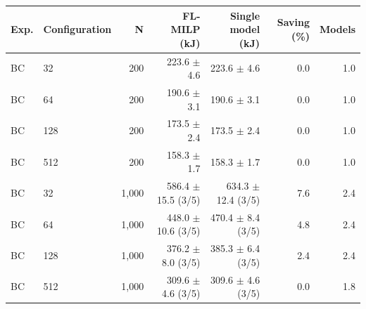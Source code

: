 \begin{tabular}{llrrrrr}
\toprule
Exp. & Configuration & N & FL-MILP (kJ) & Single model (kJ) & Saving (\%) & Models \\
\midrule
BC & 32 & 200 & 223.6 $\pm$ 4.6 & 223.6 $\pm$ 4.6 & 0.0 & 1.0 \\
BC & 64 & 200 & 190.6 $\pm$ 3.1 & 190.6 $\pm$ 3.1 & 0.0 & 1.0 \\
BC & 128 & 200 & 173.5 $\pm$ 2.4 & 173.5 $\pm$ 2.4 & 0.0 & 1.0 \\
BC & 512 & 200 & 158.3 $\pm$ 1.7 & 158.3 $\pm$ 1.7 & 0.0 & 1.0 \\
BC & 32 & 1,000 & 586.4 $\pm$ 15.5 (3/5) & 634.3 $\pm$ 12.4 (3/5) & 7.6 & 2.4 \\
BC & 64 & 1,000 & 448.0 $\pm$ 10.6 (3/5) & 470.4 $\pm$ 8.4 (3/5) & 4.8 & 2.4 \\
BC & 128 & 1,000 & 376.2 $\pm$ 8.0 (3/5) & 385.3 $\pm$ 6.4 (3/5) & 2.4 & 2.4 \\
BC & 512 & 1,000 & 309.6 $\pm$ 4.6 (3/5) & 309.6 $\pm$ 4.6 (3/5) & 0.0 & 1.8 \\
\bottomrule
\end{tabular}
